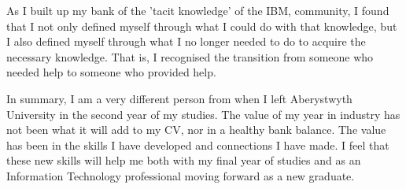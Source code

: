 \documentclass[12pt,a4paper]{article}
\begin{document}
As I built up my bank of the 'tacit knowledge' \cite{SocialKnowing} of the IBM, 
community, I found that I
not only defined myself through what I could do with that knowledge, but I also
defined myself through what I no longer needed to do to acquire the necessary
knowledge. That is, I recognised the transition from someone who needed help   
to someone who provided help.

In summary, I am a very different person from when I left Aberystwyth University
in the second year of my studies. The value of my year in industry has not been
what it will add to my CV, nor in a healthy bank balance. The value has been in
the skills I have developed and connections I have made. I feel that these new
skills will help me both with my final year of studies and as an Information 
Technology professional moving forward as a new graduate.

\pagebreak



\end{document}

